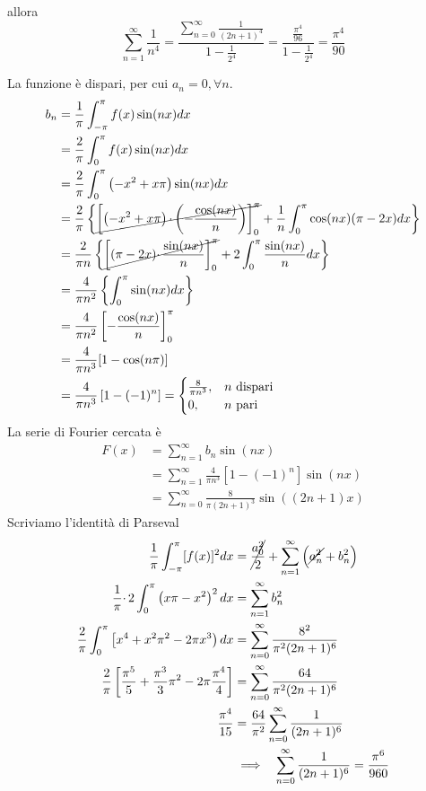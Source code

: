 allora
\begin{equation*}
\sum\limits ^{\infty }_{n=1}\frac{1}{n^{4}} =\frac{\sum\limits ^{\infty }_{n=0}\frac{1}{( 2n+1)^{4}}}{1-\frac{1}{2^{4}}} =\frac{\frac{\pi ^{4}}{96}}{1-\frac{1}{2^{4}}} =\frac{\pi ^{4}}{90}
\end{equation*}
\Soluzione

La funzione è dispari, per cui $a_{n} =0,\forall n$.
\begin{align*}
b_{n} & =\frac{1}{\pi }\int ^{\pi }_{-\pi } f( x)\sin( nx) dx\\
 & =\frac{2}{\pi }\int ^{\pi }_{0} f( x)\sin( nx) dx\\
 & =\frac{2}{\pi }\int ^{\pi }_{0}\left( -x^{2} +x\pi \right)\sin( nx) dx\\
 & =\frac{2}{\pi }\left\{\cancel{\left[\left( -x^{2} +x\pi \right) \cdotp \left( -\frac{\cos( nx)}{n}\right)\right]^{\pi }_{0}} +\frac{1}{n}\int ^{\pi }_{0}\cos( nx)( \pi -2x) dx\right\}\\
 & =\frac{2}{\pi n}\left\{\cancel{\left[( \pi -2x) \cdotp \frac{\sin( nx)}{n}\right]^{\pi }_{0}} +2\int ^{\pi }_{0}\frac{\sin( nx)}{n} dx\right\}\\
 & =\frac{4}{\pi n^{2}}\left\{\int ^{\pi }_{0}\sin( nx) dx\right\}\\
 & =\frac{4}{\pi n^{2}}\left[ -\frac{\cos( nx)}{n}\right]^{\pi }_{0}\\
 & =\frac{4}{\pi n^{3}}[ 1-\cos( n\pi )]\\
 & =\frac{4}{\pi n^{3}}\left[ 1-( -1)^{n}\right] =\begin{cases}
\frac{8}{\pi n^{3}} , & n\ \text{dispari}\\
0, & n\ \text{pari}
\end{cases}
\end{align*}
La serie di Fourier cercata è
\begin{align*}
F( x) & =\sum\limits ^{\infty }_{n=1} b_{n}\sin( nx)\\
 & =\sum\limits ^{\infty }_{n=1}\frac{4}{\pi n^{3}}\left[ 1-( -1)^{n}\right]\sin( nx)\\
 & =\sum\limits ^{\infty }_{n=0}\frac{8}{\pi ( 2n+1)^{3}}\sin(( 2n+1) x)
\end{align*}
Scriviamo l'identità di Parseval
\begin{align*}
\frac{1}{\pi }\int ^{\pi }_{-\pi }[ f( x)]^{2} dx & =\cancel{\frac{a^{2}_{0}}{2}} +\sum\limits ^{\infty }_{n=1}\left(\cancel{a^{2}_{n}} +b^{2}_{n}\right)\\
\frac{1}{\pi } \cdotp 2\int ^{\pi }_{0}\left( x\pi -x^{2}\right)^{2} dx & =\sum\limits ^{\infty }_{n=1} b^{2}_{n}\\
\frac{2}{\pi }\int ^{\pi }_{0}\left[ x^{4} +x^{2} \pi ^{2} -2\pi x^{3}\right) dx & =\sum\limits ^{\infty }_{n=0}\frac{8^{2}}{\pi ^{2}( 2n+1)^{6}}\\
\frac{2}{\pi }\left[\frac{\pi ^{5}}{5} +\frac{\pi ^{3}}{3} \pi ^{2} -2\pi \frac{\pi ^{4}}{4}\right] & =\sum\limits ^{\infty }_{n=0}\frac{64}{\pi ^{2}( 2n+1)^{6}}\\
\frac{\pi ^{4}}{15} & =\frac{64}{\pi ^{2}}\sum\limits ^{\infty }_{n=0}\frac{1}{( 2n+1)^{6}}\\
 & \implies \ \ \sum\limits ^{\infty }_{n=0}\frac{1}{( 2n+1)^{6}} =\frac{\pi ^{6}}{960}
\end{align*}
